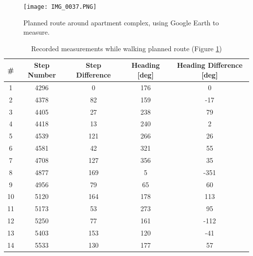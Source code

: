 \documentclass[12pt,letterpaper, onecolumn]{exam}
\begin{document}
\begin{questions}
{        \begin{figure}[!h]
            \centering
            \texttt{[image: IMG\_0037.PNG]}
            \caption{Planned route around apartment complex, using Google Earth to measure.}
            \label{fig:gmap}
        \end{figure}

        \begin{table}[!h]
            \caption{Recorded measurements while walking planned route (Figure \ref{fig:gmap})}
            \label{tbl:1}
            \centering
            \begin{tabular}{|c|c|c|c|c|}
                \hline
                \# & Step Number & Step Difference & Heading [deg] & Heading Difference [deg] \\ \hline
                1  & 4296        & 0               & 176           & 0                        \\
                2  & 4378        & 82              & 159           & -17                      \\
                3  & 4405        & 27              & 238           & 79                       \\
                4  & 4418        & 13              & 240           & 2                        \\
                5  & 4539        & 121             & 266           & 26                       \\
                6  & 4581        & 42              & 321           & 55                       \\
                7  & 4708        & 127             & 356           & 35                       \\
                8  & 4877        & 169             & 5             & -351                     \\
                9  & 4956        & 79              & 65            & 60                       \\
                10 & 5120        & 164             & 178           & 113                      \\
                11 & 5173        & 53              & 273           & 95                       \\
                12 & 5250        & 77              & 161           & -112                     \\
                13 & 5403        & 153             & 120           & -41                      \\
                14 & 5533        & 130             & 177           & 57                       \\

\end{tabular}
\end{table}}
\end{questions}
\end{document}
